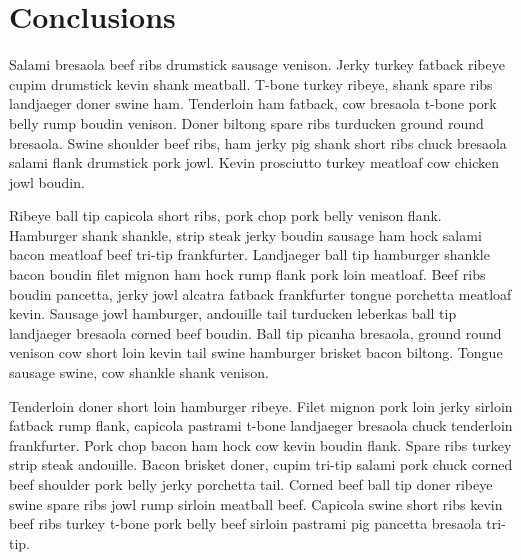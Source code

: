 \documentclass{article}
\begin{document}
\section{Conclusions}

Salami bresaola beef ribs drumstick sausage venison. Jerky turkey fatback ribeye cupim drumstick kevin shank meatball. T-bone turkey ribeye, shank spare ribs landjaeger doner swine ham. Tenderloin ham fatback, cow bresaola t-bone pork belly rump boudin venison. Doner biltong spare ribs turducken ground round bresaola. Swine shoulder beef ribs, ham jerky pig shank short ribs chuck bresaola salami flank drumstick pork jowl. Kevin prosciutto turkey meatloaf cow chicken jowl boudin.

Ribeye ball tip capicola short ribs, pork chop pork belly venison flank. Hamburger shank shankle, strip steak jerky boudin sausage ham hock salami bacon meatloaf beef tri-tip frankfurter. Landjaeger ball tip hamburger shankle bacon boudin filet mignon ham hock rump flank pork loin meatloaf. Beef ribs boudin pancetta, jerky jowl alcatra fatback frankfurter tongue porchetta meatloaf kevin. Sausage jowl hamburger, andouille tail turducken leberkas ball tip landjaeger bresaola corned beef boudin. Ball tip picanha bresaola, ground round venison cow short loin kevin tail swine hamburger brisket bacon biltong. Tongue sausage swine, cow shankle shank venison.

Tenderloin doner short loin hamburger ribeye. Filet mignon pork loin jerky sirloin fatback rump flank, capicola pastrami t-bone landjaeger bresaola chuck tenderloin frankfurter. Pork chop bacon ham hock cow kevin boudin flank. Spare ribs turkey strip steak andouille. Bacon brisket doner, cupim tri-tip salami pork chuck corned beef shoulder pork belly jerky porchetta tail. Corned beef ball tip doner ribeye swine spare ribs jowl rump sirloin meatball beef. Capicola swine short ribs kevin beef ribs turkey t-bone pork belly beef sirloin pastrami pig pancetta bresaola tri-tip.
\end{document}
